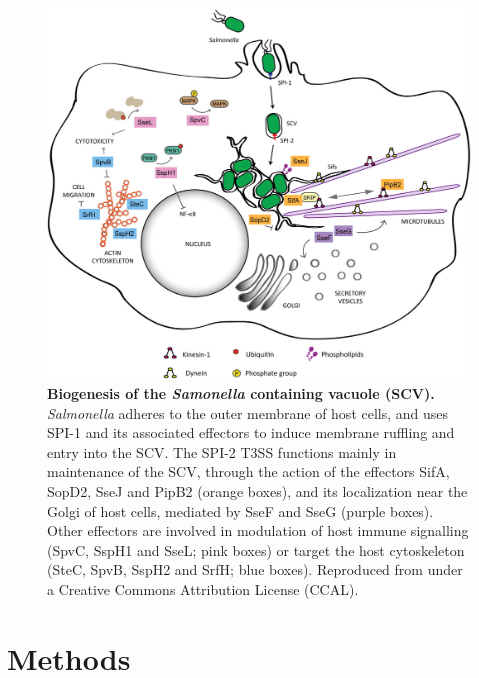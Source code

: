 \begin{figure}[htp]
\begin{center}
\includegraphics[width=14cm]{SCV.jpg}
\caption[Biogenesis of the \textit{Samonella} containing vacuole]{\textbf{Biogenesis of the \textit{Samonella} containing vacuole (SCV).} \textit{Salmonella} adheres to the outer membrane of host cells, and uses SPI-1 and its associated effectors to induce membrane ruffling and entry into the SCV. The SPI-2 T3SS functions mainly in maintenance of the SCV, through the action of the effectors SifA, SopD2, SseJ and PipB2 (orange boxes), and its localization near the Golgi of host cells, mediated by SseF and SseG (purple boxes). Other effectors are involved in modulation of host immune signalling (SpvC, SspH1 and SseL; pink boxes) or target the host cytoskeleton (SteC, SpvB, SspH2 and SrfH; blue boxes). Reproduced from \textcite{Figueira2012} under a Creative Commons Attribution License (CCAL). 
} 
\label{fig:SCV}
\end{center}
\end{figure}

\section{Methods}

